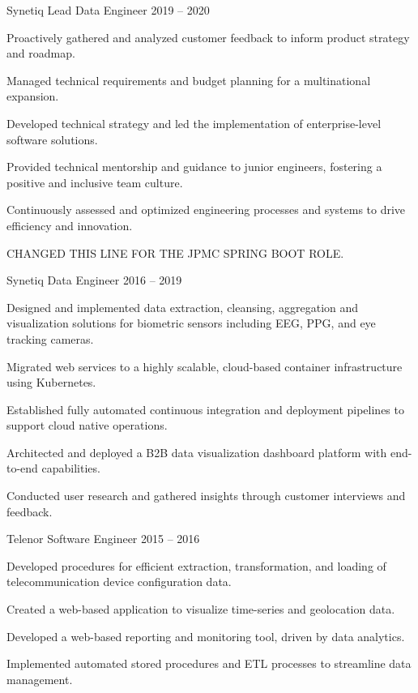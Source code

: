 \documentclass[]{awesome-cv}
\begin{document}
\begin{cventries}
	\cventry
	{Synetiq}
	{Lead Data Engineer}
	{2019 – 2020}
	{}
	{\begin{cvitems}
		\item {Proactively gathered and analyzed customer feedback to inform product strategy and roadmap.}
		\item {Managed technical requirements and budget planning for a multinational expansion.}
		\item {Developed technical strategy and led the implementation of enterprise-level software solutions.}
		\item {Provided technical mentorship and guidance to junior engineers, fostering a positive and inclusive team culture.}
		\item {Continuously assessed and optimized engineering processes and systems to drive efficiency and innovation.}
		\item {CHANGED THIS LINE FOR THE JPMC SPRING BOOT ROLE.}
		\end{cvitems}}
	\cventry
	{Synetiq}
	{Data Engineer}
	{2016 – 2019}
	{}
	{\begin{cvitems}
		\item {Designed and implemented data extraction, cleansing, aggregation and visualization solutions for biometric sensors including EEG, PPG, and eye tracking cameras.}
		\item {Migrated web services to a highly scalable, cloud-based container infrastructure using Kubernetes.}
		\item {Established fully automated continuous integration and deployment pipelines to support cloud native operations.}
		\item {Architected and deployed a B2B data visualization dashboard platform with end-to-end capabilities.}
		\item {Conducted user research and gathered insights through customer interviews and feedback.}
		\end{cvitems}}
	\cventry
	{Telenor}
	{Software Engineer}
	{2015 – 2016}
	{}
	{\begin{cvitems}
		\item {Developed procedures for efficient extraction, transformation, and loading of telecommunication device configuration data.}
		\item {Created a web-based application to visualize time-series and geolocation data.}
		\item {Developed a web-based reporting and monitoring tool, driven by data analytics.}
		\item {Implemented automated stored procedures and ETL processes to streamline data management.}
		\end{cvitems}}
\end{cventries}
\end{document}
